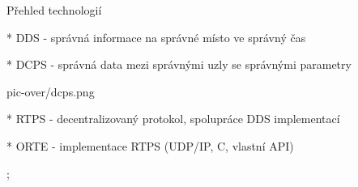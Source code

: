 \sec Přehled technologií

* DDS - správná informace na správné místo ve správný čas

* DCPS - správná data mezi správnými uzly se správnými parametry \nl

\centerline{\picw=14cm \inspic pic-over/dcps.png }

* RTPS - decentralizovaný protokol, spolupráce DDS implementací

* ORTE - implementace RTPS (UDP/IP, C, vlastní API)

\pg;
